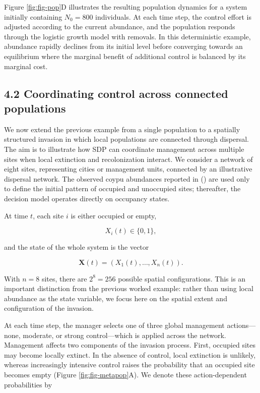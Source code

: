 \documentclass[
  11pt,
  a4paper,
]{article}
\begin{document}
Figure \ref{fig:fig-pop}D illustrates the resulting population dynamics for a system initially containing \(N_0 = 800\) individuals. At each time step, the control effort is adjusted according to the current abundance, and the population responds through the logistic growth model with removals. In this deterministic example, abundance rapidly declines from its initial level before converging towards an equilibrium where the marginal benefit of additional control is balanced by its marginal cost.

\subsection{4.2 Coordinating control across connected populations}\label{coordinating-control-across-connected-populations}

We now extend the previous example from a single population to a spatially structured invasion in which local populations are connected through dispersal. The aim is to illustrate how SDP can coordinate management across multiple sites when local extinction and recolonization interact. We consider a network of eight sites, representing cities or management units, connected by an illustrative dispersal network. The observed coypu abundances reported in () are used only to define the initial pattern of occupied and unoccupied sites; thereafter, the decision model operates directly on occupancy states.

At time \(t\), each site \(i\) is either occupied or empty,

\[
X_i(t) \in \{0,1\},
\]

and the state of the whole system is the vector

\[
\mathbf{X}(t) =
\left(
X_1(t),\ldots,X_n(t)
\right).
\]

With \(n=8\) sites, there are \(2^8=256\) possible spatial configurations. This is an important distinction from the previous worked example: rather than using local abundance as the state variable, we focus here on the spatial extent and configuration of the invasion.

At each time step, the manager selects one of three global management actions---none, moderate, or strong control---which is applied across the network. Management affects two components of the invasion process. First, occupied sites may become locally extinct. In the absence of control, local extinction is unlikely, whereas increasingly intensive control raises the probability that an occupied site becomes empty (Figure \ref{fig:fig-metapop}A). We denote these action-dependent probabilities by
\end{document}
